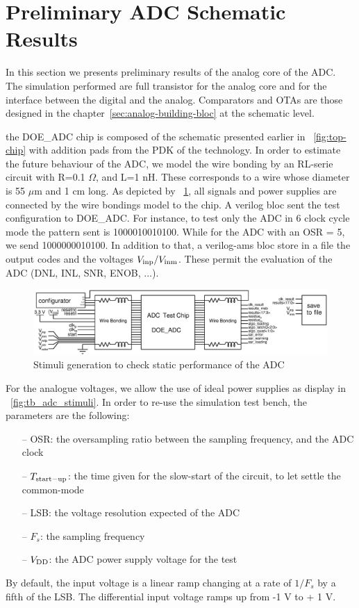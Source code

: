 \clearpage
\section{Preliminary ADC Schematic Results}
In this section we presents preliminary results of the analog core of the ADC\@. The simulation performed are full transistor for the analog core and for the interface between the digital and the analog. Comparators and OTAs are those designed in the chapter~\ref{sec:analog-building-bloc} at the schematic level.

the DOE\_ADC chip is composed of the schematic presented earlier in \figurename~\ref{fig:top-chip} with addition pads from the PDK of the technology. In order to estimate the future behaviour of the ADC, we model the wire bonding by an RL-serie circuit with R=0.1 $\Omega$, and L=1 nH. These corresponds to a wire whose diameter is 55 $\mu$m and 1 cm long.
As depicted by \figurename~\ref{fig:tb_adc-top}, all signals and power supplies are connected by the wire bondings model to the chip. A verilog bloc sent the test configuration to DOE\_ADC\@. For instance, to test only the ADC in 6 clock cycle mode the pattern sent is 1000010010100. While for the ADC with an OSR = 5, we send 1000000010100. In addition to that, a verilog-ams bloc store in a file the output codes and the voltages $V_{\rm inp}/V_{\rm inm}$. These permit the evaluation of the ADC (DNL, INL, SNR, ENOB, ...).

\begin{figure}[htp]
    \centering
    \includegraphics[width=\textwidth]{Chapter5/Figs/adc_chip/tb_adc_full.ps}
    \caption{Stimuli generation to check static performance of the ADC}
    \label{fig:tb_adc-top}
\end{figure}

For the analogue voltages, we allow the use of ideal power supplies as display in \figurename~\ref{fig:tb_adc_stimuli}. In order to re-use the simulation test bench, the parameters are the following:
\begin{itemize}
    \item[--] OSR: the oversampling ratio between the sampling frequency, and the ADC clock
    \item[--] $T_{\rm start-up}$: the time given for the slow-start of the circuit, to let settle the common-mode
    \item[--] LSB: the voltage resolution expected of the ADC
    \item[--] $F_s$: the sampling frequency
    \item[--] $V_{\rm DD}$: the ADC power supply voltage for the test
\end{itemize}
By default, the input voltage is a linear ramp changing at a rate of $1/F_s$ by a fifth of the LSB\@. The differential input voltage ramps up from -1 V to + 1 V.

